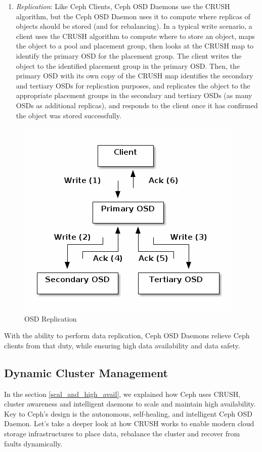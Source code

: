 \documentclass[12pt,a4paper]{report}
\begin{document}
\begin{enumerate}
	\item \emph{Replication}: Like Ceph Clients, Ceph OSD Daemons use the
		CRUSH algorithm, but the Ceph OSD Daemon uses it to compute
		where replicas of objects should be stored (and for
		rebalancing). In a typical write scenario, a client uses the
		CRUSH algorithm to compute where to store an object, maps the
		object to a pool and placement group, then looks at the CRUSH
		map to identify the primary OSD for the placement group.  The
		client writes the object to the identified placement group in
		the primary OSD. Then, the primary OSD with its own copy of the
		CRUSH map identifies the secondary and tertiary OSDs for
		replication purposes, and replicates the object to the
		appropriate placement groups in the secondary and tertiary OSDs
		(as many OSDs as additional replicas), and responds to the
		client once it has confirmed the object was stored
		successfully.
\end{enumerate}

\begin{figure}[h]
	\includegraphics[scale=0.60]{replication.png}
	\caption{OSD Replication}
	\label{fig:osd_replication}
\end{figure}

With the ability to perform data replication, Ceph OSD Daemons relieve Ceph clients from that duty, while ensuring high data availability and data safety.

\subsection{Dynamic Cluster Management}

In the section \ref{scal_and_high_avail}, we explained how Ceph uses CRUSH,
cluster awareness and intelligent daemons to scale and maintain high
availability. Key to Ceph’s design is the autonomous, self-healing, and
intelligent Ceph OSD Daemon. Let’s take a deeper look at how CRUSH works to
enable modern cloud storage infrastructures to place data, rebalance the
cluster and recover from faults dynamically.
\end{document}
